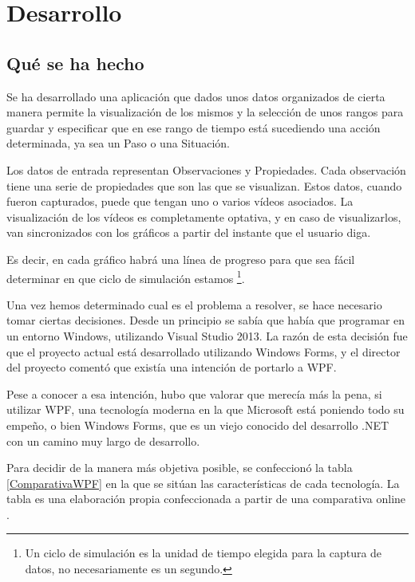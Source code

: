 \chapter{Desarrollo}

\section{Qu\'{e} se ha hecho}
Se ha desarrollado una aplicaci\'{o}n que dados unos datos organizados
de cierta manera permite la visualizaci\'{o}n de los mismos y
la selecci\'{o}n de unos rangos para guardar y especificar que en ese rango de tiempo
est\'{a} sucediendo una acci\'{o}n determinada, ya sea un Paso o una Situaci\'on.

Los datos de entrada representan Observaciones y Propiedades. Cada observaci\'{o}n tiene una serie
de propiedades que son las que se visualizan. Estos datos, cuando fueron capturados, puede
que tengan uno o varios v\'{i}deos asociados. La visualizaci\'{o}n de los v\'{i}deos es completamente
optativa, y en caso de visualizarlos, van sincronizados con los gr\'{a}ficos a partir del instante que el 
usuario diga.

Es decir, en cada gr\'{a}fico habr\'{a} una l\'{i}nea de progreso para que sea f\'{a}cil determinar en que ciclo
de simulaci\'{o}n estamos \footnote{Un ciclo de simulaci\'{o}n es la unidad de tiempo elegida para la captura de datos, no
    necesariamente es un segundo.}.

Una vez hemos determinado cual es el problema a resolver, se hace necesario tomar ciertas decisiones.
Desde un principio se sab\'ia que hab\'ia que programar en un entorno Windows, utilizando Visual Studio 2013.
La raz\'on de esta decisi\'on fue que el proyecto actual est\'a desarrollado utilizando Windows Forms, y el 
director del proyecto coment\'o que exist\'ia una intenci\'on de portarlo a WPF.

Pese a conocer a esa intenci\'on, hubo que valorar que merec\'ia m\'as la pena, si utilizar WPF, una tecnolog\'ia moderna
en la que Microsoft est\'a poniendo todo su empe\~no, o bien Windows Forms, que es un viejo conocido del desarrollo
.NET con un camino muy largo de desarrollo.

Para decidir de la manera m\'as objetiva posible, se confeccion\'o la tabla \ref{ComparativaWPF} en la que se sit\'uan 
las caracter\'isticas de cada tecnolog\'ia. La tabla es una elaboraci\'on propia confeccionada a partir de una comparativa
online \cite{WPFvsWinForms:Comparative}.

